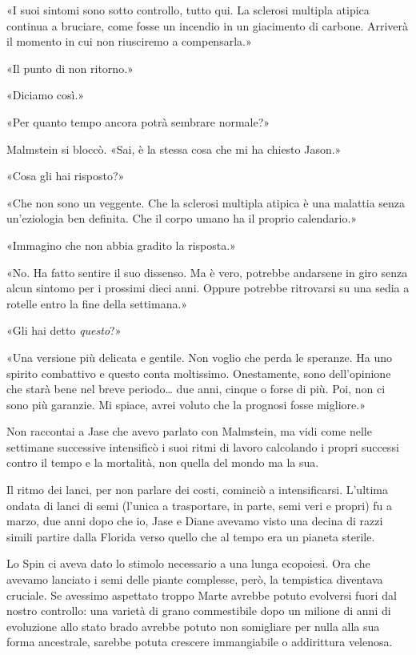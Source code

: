 «I suoi sintomi sono sotto controllo, tutto qui. La sclerosi multipla
atipica continua a bruciare, come fosse un incendio in un giacimento di
carbone. Arriverà il momento in cui non riusciremo a compensarla.»

«Il punto di non ritorno.»

«Diciamo così.»

«Per quanto tempo ancora potrà sembrare normale?»

Malmstein si bloccò. «Sai, è la stessa cosa che mi ha chiesto Jason.»

«Cosa gli hai risposto?»

«Che non sono un veggente. Che la sclerosi multipla atipica è una
malattia senza un'eziologia ben definita. Che il corpo umano ha il
proprio calendario.»

«Immagino che non abbia gradito la risposta.»

«No. Ha fatto sentire il suo dissenso. Ma è vero, potrebbe andarsene in
giro senza alcun sintomo per i prossimi dieci anni. Oppure potrebbe
ritrovarsi su una sedia a rotelle entro la fine della settimana.»

«Gli hai detto \emph{questo}?»

«Una versione più delicata e gentile. Non voglio che perda le speranze.
Ha uno spirito combattivo e questo conta moltissimo. Onestamente, sono
dell'opinione che starà bene nel breve periodo\ldots{} due anni, cinque
o forse di più. Poi, non ci sono più garanzie. Mi spiace, avrei voluto
che la prognosi fosse migliore.»

Non raccontai a Jase che avevo parlato con Malmstein, ma vidi come nelle
settimane successive intensificò i suoi ritmi di lavoro calcolando i
propri successi contro il tempo e la mortalità, non quella del mondo ma
la sua.

\separatorefiori

Il ritmo dei lanci, per non parlare dei costi, cominciò a
intensificarsi. L'ultima ondata di lanci di semi (l'unica a trasportare,
in parte, semi veri e propri) fu a marzo, due anni dopo che io, Jase e
Diane avevamo visto una decina di razzi simili partire dalla Florida
verso quello che al tempo era un pianeta sterile.

Lo Spin ci aveva dato lo stimolo necessario a una lunga ecopoiesi. Ora
che avevamo lanciato i semi delle piante complesse, però, la tempistica
diventava cruciale. Se avessimo aspettato troppo Marte avrebbe potuto
evolversi fuori dal nostro controllo: una varietà di grano commestibile
dopo un milione di anni di evoluzione allo stato brado avrebbe potuto
non somigliare per nulla alla sua forma ancestrale, sarebbe potuta
crescere immangiabile o addirittura velenosa.

